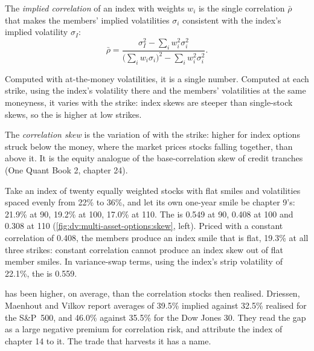 \begin{definition}\label{def:dv:multi-asset-options:implied}
The \emph{implied correlation} of an index with weights $w_i$ is the single correlation
$\bar\rho$ that makes the members' implied volatilities $\sigma_i$ consistent with the index's implied volatility
$\sigma_I$:
\[
\bar\rho=\frac{\sigma_I^2-\sum_iw_i^2\sigma_i^2}{\bigl(\sum_iw_i\sigma_i\bigr)^2-\sum_iw_i^2\sigma_i^2}.
\]
\end{definition}

Computed with at-the-money volatilities, it is a single number. Computed at each strike, using the index's volatility
there and the members' volatilities at the same moneyness, it varies with the strike: index skews are steeper than
single-stock skews, so the  is higher at low strikes.

\begin{definition}\label{def:dv:multi-asset-options:skew}
The \emph{correlation skew} is the variation of  with the strike: higher for
index options struck below the money, where the market prices stocks falling together, than above it. It is the
equity analogue of the base-correlation skew of credit tranches (One Quant Book 2, chapter 24).
\end{definition}

\begin{example}\label{ex:dv:multi-asset-options:index}
Take an index of twenty equally weighted stocks with flat smiles and volatilities spaced evenly from 22\% to 36\%, and let
its own one-year smile be chapter 9's: 21.9\% at 90, 19.2\% at 100, 17.0\% at 110. The  is 0.549 at 90,
0.408 at 100 and 0.308 at 110 (\cref{fig:dv:multi-asset-options:skew}, left). Priced with a constant correlation of 0.408,
the members produce an index smile that is flat, 19.3\% at all three strikes: constant correlation cannot produce an index
skew out of flat member smiles. In variance-swap terms, using the index's strip volatility of 22.1\%, the 
is 0.559.
\end{example}

 has been higher, on average, than the correlation stocks then realised. Driessen, Maenhout and Vilkov
report averages of 39.5\% implied against 32.5\% realised for the S\&P~500, and 46.0\% against 35.5\% for the Dow Jones
30. They read the gap as a large negative premium for correlation risk, and attribute the index  of
chapter 14 to it. The trade that harvests it has a name.

